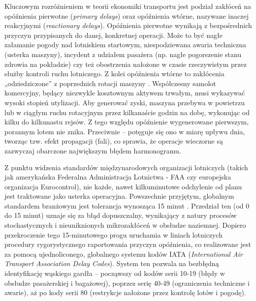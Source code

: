 Kluczowym rozróżnieniem w teorii ekonomiki transportu jest podział zakłóceń na opóźnienia pierwotne (\textit{primary delays}) oraz opóźnienia wtórne, nazywane inaczej reakcyjnymi (\textit{reactionary delays}). Opóźnienia pierwotne wynikają z bezpośrednich przyczyn przypisanych do danej, konkretnej operacji. Może to być nagłe załamanie pogody nad lotniskiem startowym, niespodziewana awaria techniczna (usterka maszyny), incydent z udziałem pasażera (np. nagłe pogorszenie stanu zdrowia na pokładzie) czy też obostrzenia nałożone w czasie rzeczywistym przez służby kontroli ruchu lotniczego. Z kolei opóźnienia wtórne to zakłócenia „odziedziczone” z poprzednich rotacji maszyny \cite{propagation2009}. Współczesny samolot komercyjny, będący niezwykle kosztownym aktywem trwałym, musi wykazywać wysoki stopień utylizacji. Aby generować zyski, maszyna przebywa w powietrzu lub w ciągłym ruchu rotacyjnym przez kilkanaście godzin na dobę, wykonując od kilku do kilkunastu rejsów. Z tego względu opóźnienie wygenerowane pierwszym, porannym lotem nie znika. Przeciwnie – potęguje się ono w miarę upływu dnia, tworząc tzw. efekt propagacji (fali), co sprawia, że operacje wieczorne są zazwyczaj obarczone największym błędem harmonogramu.

Z punktu widzenia standardów międzynarodowych organizacji lotniczych (takich jak amerykańska Federalna Administracja Lotnictwa - FAA czy europejska organizacja Eurocontrol), nie każde, nawet kilkuminutowe odchylenie od planu jest traktowane jako usterka operacyjna. Powszechnie przyjętym, globalnym standardem branżowym jest tolerancja wynosząca 15 minut \cite{eurocontrol2024}. Przedział ten (od 0 do 15 minut) uznaje się za błąd dopuszczalny, wynikający z natury procesów stochastycznych i nieuniknionych mikrozakłóceń w obsłudze naziemnej. Dopiero przekroczenie tego 15-minutowego progu uruchamia w liniach lotniczych procedury rygorystycznego raportowania przyczyn opóźnienia, co realizowane jest za pomocą ujednoliconego, globalnego systemu kodów IATA (\textit{International Air Transport Association Delay Codes}). System ten pozwala na bezbłędną identyfikację wąskiego gardła – począwszy od kodów serii 10-19 (błędy w obsłudze pasażerskiej i bagażowej), poprzez serię 40-49 (ograniczenia techniczne i awarie), aż po kody serii 80 (restrykcje nałożone przez kontrolę lotów i pogodę).

